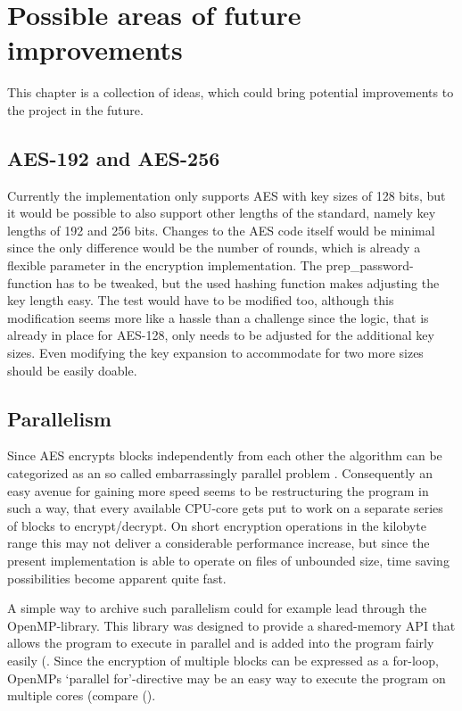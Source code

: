 \hypertarget{possible-areas-of-future-improvements}{%
\chapter{Possible areas of future
improvements}\label{possible-areas-of-future-improvements}}

This chapter is a collection of ideas, which could bring potential
improvements to the project in the future.

\hypertarget{aes-192-and-aes-256}{%
\section{AES-192 and AES-256}\label{aes-192-and-aes-256}}

Currently the implementation only supports AES with key sizes of 128
bits, but it would be possible to also support other lengths of the
standard, namely key lengths of 192 and 256 bits. Changes to the AES
code itself would be minimal since the only difference would be the
number of rounds, which is already a flexible parameter in the
encryption implementation. The prep\_password-function has to be
tweaked, but the used hashing function makes adjusting the key length
easy. The test would have to be modified too, although this modification
seems more like a hassle than a challenge since the logic, that is
already in place for AES-128, only needs to be adjusted for the
additional key sizes. Even modifying the key expansion to accommodate
for two more sizes should be easily doable.

\hypertarget{parallelism}{%
\section{Parallelism}\label{parallelism}}

Since AES encrypts blocks independently from each other the algorithm
can be categorized as an so called embarrassingly parallel problem
\cite[p.48]{parallelprog}. Consequently an easy avenue for gaining more
speed seems to be restructuring the program in such a way, that every
available \ac{CPU}-core gets put to work on a separate series of blocks to
encrypt/decrypt. On short encryption operations in the kilobyte range
this may not deliver a considerable performance increase, but since the
present implementation is able to operate on files of unbounded size,
time saving possibilities become apparent quite fast.

A simple way to archive such parallelism could for example lead through
the OpenMP-library. This library was designed to provide a shared-memory
API that allows the program to execute in parallel and is added into the
program fairly easily (\cite[ch. 5]{parallelprog}. Since the encryption of
multiple blocks can be expressed as a for-loop, OpenMPs `parallel
for'-directive may be an easy way to execute the program on multiple
cores (compare (\cite[ch. 5.5]{parallelprog}).

